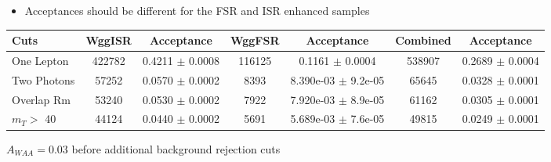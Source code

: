 \documentclass{beamer}
\begin{document}
 {

    \begin{itemize}
        \item Acceptances should be different for the FSR and ISR enhanced samples
    \end{itemize}

    \vspace{4mm}
  
    \tiny

    \begin{tabular}{| l | c | c | c | c | c | c | }
    Cuts         & WggISR            & Acceptance           & WggFSR            & Acceptance               & Combined          & Acceptance      \\  \hline
    One Lepton   & 422782 & 0.4211 $\pm$ 0.0008  & 116125  & 0.1161 $\pm$ 0.0004      & 538907  & 0.2689 $\pm$ 0.0004 \\ 
    Two Photons  & 57252  & 0.0570 $\pm$ 0.0002  & 8393    & 8.390e-03 $\pm$ 9.2e-05  & 65645   & 0.0328 $\pm$ 0.0001 \\ 
    Overlap Rm   & 53240  & 0.0530 $\pm$ 0.0002  & 7922    & 7.920e-03 $\pm$ 8.9e-05  & 61162   & 0.0305 $\pm$ 0.0001 \\ 
    $m_{T} >$ 40 & 44124  & 0.0440 $\pm$ 0.0002  & 5691    & 5.689e-03 $\pm$ 7.6e-05  & 49815   & 0.0249 $\pm$ 0.0001 \\ 
     \end{tabular}

    \vspace{5mm}

    \centering
      \large
        $A_{WAA} = 0.03$ before additional background rejection cuts


}
\end{document}
